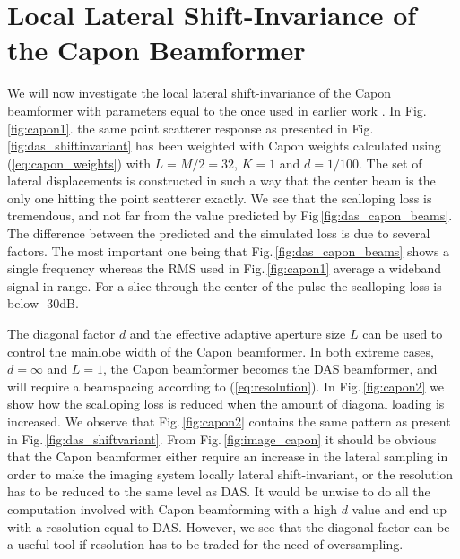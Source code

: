 \documentclass[journal]{IEEEtran}
\newcommand{\img}{img/}
\begin{document}
\section{Local Lateral Shift-Invariance of the Capon Beamformer}
We will now investigate the local lateral shift-invariance of the Capon beamformer with parameters equal to the once used in earlier work \cite{Synnevag2009, Asen}. In Fig.\,\ref{fig:capon1}. the same point scatterer response as presented in Fig.\,\ref{fig:das_shiftinvariant} has been weighted with Capon weights calculated using (\ref{eq:capon_weights}) with $L = M/2 = 32$, $K=1$ and $d=1/100$. The set of lateral displacements is constructed in such a way that the center beam is the only one hitting the point scatterer exactly. We see that the scalloping loss is tremendous, and not far from the value predicted by Fig\,\ref{fig:das_capon_beams}. The difference between the predicted and the simulated loss is due to several factors. The most important one being that Fig.\,\ref{fig:das_capon_beams} shows a single frequency whereas the RMS used in Fig.\,\ref{fig:capon1} average a wideband signal in range. For a slice through the center of the pulse the scalloping loss is below -30dB.

The diagonal factor $d$ and the effective adaptive aperture size $L$ can be used to control the mainlobe width of the Capon beamformer. In both extreme cases, $d=\infty$ and $L=1$, the Capon beamformer becomes the DAS beamformer, and will require a beamspacing according to (\ref{eq:resolution}). In Fig.\,\ref{fig:capon2} we show how the scalloping loss is reduced when the amount of diagonal loading is increased. We observe that Fig.\,\ref{fig:capon2} contains the same pattern as present in Fig.\,\ref{fig:das_shiftvariant}. From Fig.\,\ref{fig:image_capon} it should be obvious that the Capon beamformer either require an increase in the lateral sampling in order to make the imaging system locally lateral shift-invariant, or the resolution has to be reduced to the same level as DAS. It would be unwise to do all the computation involved with Capon beamforming with a high $d$ value and end up with a resolution equal to DAS. However, we see that the diagonal factor can be a useful tool if resolution has to be traded for the need of oversampling.
  

\begin{figure*}[!t]
\centerline{
\subfloat[]{
\texttt{[image: \\img capon\_L=32\_K=1\_d=001\_2.eps]}\label{fig:capon1}
}
\subfloat[]{
\texttt{[image: \\img capon\_L=32\_K=1\_d=1\_2.eps]}\label{fig:capon2}
}
}
\caption{...}
\label{fig:image_capon}
\end{figure*}
\end{document}
